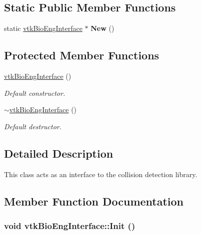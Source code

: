 \subsection*{Static Public Member Functions}
\begin{DoxyCompactItemize}
\item 
\hypertarget{classvtkBioEngInterface_ab0bafffd48213a95c2fdc51261cd404e}{
static \hyperlink{classvtkBioEngInterface}{vtkBioEngInterface} $\ast$ {\bfseries New} ()}
\label{classvtkBioEngInterface_ab0bafffd48213a95c2fdc51261cd404e}

\end{DoxyCompactItemize}
\subsection*{Protected Member Functions}
\begin{DoxyCompactItemize}
\item 
\hypertarget{classvtkBioEngInterface_a99709eb5036d8015bb14ecf3a40c8374}{
\hyperlink{classvtkBioEngInterface_a99709eb5036d8015bb14ecf3a40c8374}{vtkBioEngInterface} ()}
\label{classvtkBioEngInterface_a99709eb5036d8015bb14ecf3a40c8374}

\begin{DoxyCompactList}\small\item\em Default constructor. \item\end{DoxyCompactList}\item 
\hypertarget{classvtkBioEngInterface_ac707a179d980d5c5f55786c35549c517}{
\hyperlink{classvtkBioEngInterface_ac707a179d980d5c5f55786c35549c517}{$\sim$vtkBioEngInterface} ()}
\label{classvtkBioEngInterface_ac707a179d980d5c5f55786c35549c517}

\begin{DoxyCompactList}\small\item\em Default destructor. \item\end{DoxyCompactList}\end{DoxyCompactItemize}


\subsection{Detailed Description}
This class acts as an interface to the collision detection library. 

\subsection{Member Function Documentation}
\hypertarget{classvtkBioEngInterface_a52f71a20ab8e16bbeb357642975a5b67}{
\subsubsection[{Init}]{\setlength{\rightskip}{0pt plus 5cm}void vtkBioEngInterface::Init ()}}
\label{classvtkBioEngInterface_a52f71a20ab8e16bbeb357642975a5b67}


